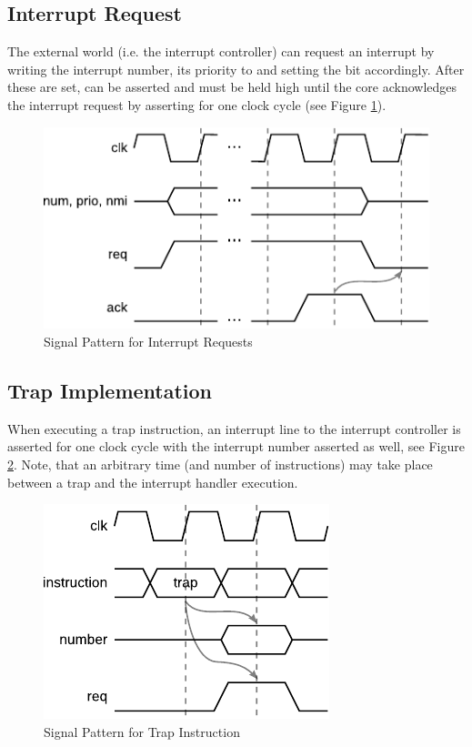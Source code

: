 \subsection{Interrupt Request}
The external world (i.e. the interrupt controller) can request an interrupt by writing the interrupt number, its priority to  and setting the  bit accordingly.
After these are set,  can be asserted and must be held high until the core acknowledges the interrupt request by asserting  for one clock cycle (see Figure \ref{fig:signal_irq_req}).

\begin{figure}[htb]
	\center
	\includegraphics[scale=1]{./figures/signal_irq_req.pdf}
	\caption{Signal Pattern for Interrupt Requests}
	\label{fig:signal_irq_req}
\end{figure}

\subsection{Trap Implementation}
\label{sec:trap}
When executing a trap instruction, an interrupt line to the interrupt controller is asserted for one clock cycle with the interrupt number asserted as well, see Figure \ref{fig:signal_irq_trap}.
Note, that an arbitrary time (and number of instructions) may take place between a trap and the interrupt handler execution.
\begin{figure}[htb]
	\centering
	\includegraphics[scale=1]{./figures/signal_irq_trap.pdf}
	\caption{Signal Pattern for Trap Instruction}
	\label{fig:signal_irq_trap}
\end{figure}

